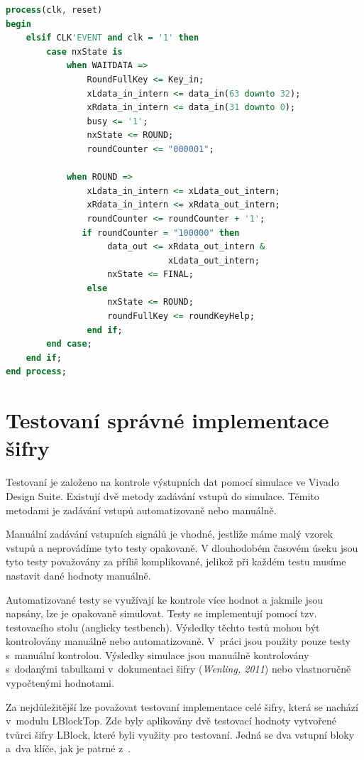 \begin{lstlisting}[language=VHDL, caption=LBlockTop, frame=single, label={vyp:loop}]
process(clk, reset)
begin
    elsif CLK'EVENT and clk = '1' then
        case nxState is
            when WAITDATA =>
                RoundFullKey <= Key_in;
                xLdata_in_intern <= data_in(63 downto 32);
                xRdata_in_intern <= data_in(31 downto 0);
                busy <= '1';
                nxState <= ROUND;
                roundCounter <= "000001";
                    
            when ROUND =>
                xLdata_in_intern <= xLdata_out_intern;
                xRdata_in_intern <= xRdata_out_intern;
                roundCounter <= roundCounter + '1';
               if roundCounter = "100000" then
                    data_out <= xRdata_out_intern &
                                xLdata_out_intern;
                    nxState <= FINAL;
                else
                    nxState <= ROUND;
                    roundFullKey <= roundKeyHelp;
                end if;
        end case;
    end if;
end process;
\end{lstlisting}
\section{Testovaní správné implementace šifry}
Testovaní je založeno na kontrole výstupních dat pomocí simulace ve 
Vivado Design Suite. Existují dvě metody zadávání vstupů do simulace. Těmito metodami je zadávání vstupů automatizovaně nebo manuálně.

Manuální zadávání vstupních signálů je vhodné, jestliže máme malý vzorek vstupů a neprovádíme tyto testy opakovaně. V dlouhodobém časovém úseku jsou tyto testy považovány za příliš komplikované, jelikož při každém testu musíme nastavit dané hodnoty manuálně.

Automatizované testy se využívají ke kontrole více hodnot a jakmile jsou napsány, lze je opakovaně simulovat. Testy se implementují pomocí tzv. testovacího stolu (anglicky testbench). Výsledky těchto testů mohou být kontrolovány manuálně nebo automatizovaně. V~práci jsou použity pouze testy s~manuální kontrolou. Výsledky simulace jsou manuálně kontrolovány s~dodanými tabulkami v~dokumentaci šifry (\emph{Wenling, 2011}\cite{LBlock}) nebo vlastnoručně vypočtenými hodnotami. 

Za nejdůležitější lze považovat testovaní implementace celé šifry, která se nachází v~modulu LBlockTop. Zde byly aplikovány dvě testovací hodnoty vytvořené tvůrci šifry LBlock, které byli využity pro testovaní. Jedná se dva vstupní bloky a~dva klíče, jak je patrné z~.

